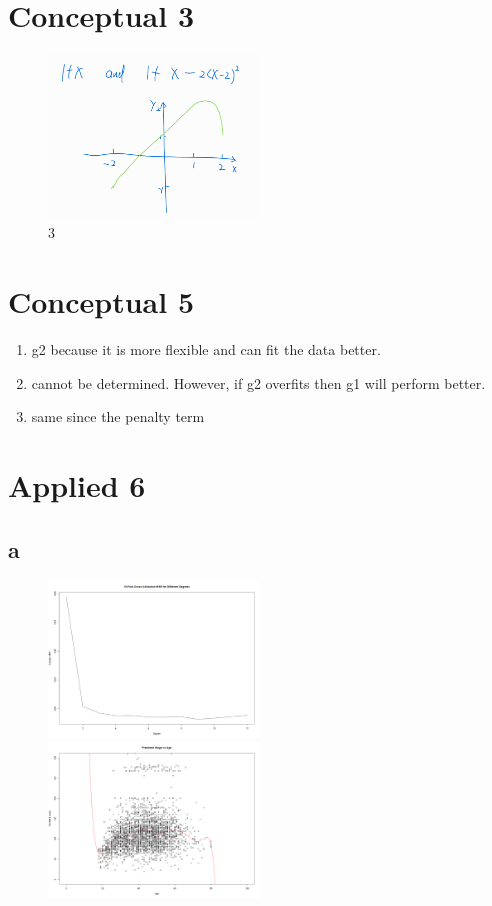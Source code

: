 \documentclass{article}
\begin{document}
\section*{Conceptual 3}
\begin{figure}[h]
    \centering
    \includegraphics[width=0.5\textwidth]{figs/3.png}
    \caption{3}
    \label{fig:q3}
\end{figure}
\newpage
\section*{Conceptual 5}
\begin{enumerate}[label=(\alph*)]
\item
g2 because it is more flexible and can fit the data better.
\item
cannot be determined. However, if g2 overfits then g1 will perform better.
\item
same since the penalty term 
\end{enumerate}

\newpage
\section*{Applied 6}
\subsection*{a}
\begin{figure}[h]
    \centering
    \includegraphics[width=0.5\textwidth]{figs/q6-a1.png}
    \includegraphics[width=0.5\textwidth]{figs/q6-a2.png}
    \caption{}
    \label{fig: plots}
\end{figure}
\inputminted{r}{src/q6a.R}
\end{document}
